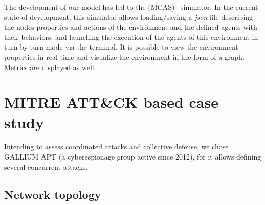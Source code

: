 The development of our model has led to the  (MCAS)~\cite{MCASWebsite} simulator. In the current state of development, this simulator allows loading/saving a \textit{json} file describing the nodes properties and actions of the environment and the defined agents with their behaviors; and launching the execution of the agents of this environment in turn-by-turn mode via the terminal. It is possible to view the environment properties in real time and visualize the environment in the form of a graph. Metrics are displayed as well.



\section{MITRE ATT\&CK based case study}


\noindent
Intending to assess coordinated attacks and collective defense, we chose GALLIUM APT (a cyberespionage group active since 2012), for it allows defining several concurrent attacks.


\subsection{Network topology}



